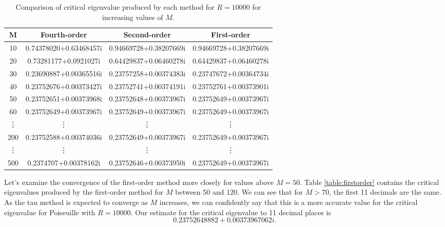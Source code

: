 \begin{table}[h!]
\centering
 \begin{tabular}{c | c | c | c} 
 M & Fourth-order & Second-order & First-order \\ [0.5ex] 
 \hline
 10 & 0.74378020+0.63468457i & 0.94669728+0.38207669i & 0.94669728+0.38207669i \\ 
 20 & 0.73281177+0.0921027i & 0.64429837+0.06460278i & 0.64429837+0.06460278i \\
 30 & 0.23690887+0.00365516i & 0.23757258+0.00374383i & 0.23747672+0.00364734i \\
 40 & 0.23752676+0.00373427i & 0.23752741+0.00374191i & 0.23752761+0.00373901i \\
 50 & 0.23752651+0.00373968i & 0.23752648+0.00373967i & 0.23752649+0.00373967i \\ 
 60 & 0.23752649+0.00373967i & 0.23752649+0.00373967i & 0.23752649+0.00373967i \\
 \vdots & \vdots & \vdots & \vdots \\
 200 & 0.23752588+0.00374036i & 0.23752649+0.00373967i & 0.23752649+0.00373967i \\
 \vdots & \vdots & \vdots & \vdots \\
 500 & 0.2374707+0.00378162i & 0.23752646+0.00373950i & 0.23752649+0.00373967i \\
 \end{tabular}
 \caption{Comparison of critical eigenvalue produced by each method for $ R = 10000 $ for increasing values of $ M $. }
 \label{table:comparison}
\end{table}

Let's examine the convergence of the first-order method more closely for values above $ M = 50$. Table \ref{table:firstorder} contains the critical eigenvalues produced by the first-order method for $ M $ between 50 and 120. We can see that for $ M > 70$, the first 11 decimals are the same. As the tau method is expected to converge as $M $ increases, we can confidently say that this is a more accurate value for the critical eigenvalue for Poiseuille with $ R = 10000 $. Our estimate for the critical eigenvalue to 11 decimal places is
\begin{equation}
    0.23752648882+0.00373967062i.
\end{equation}

